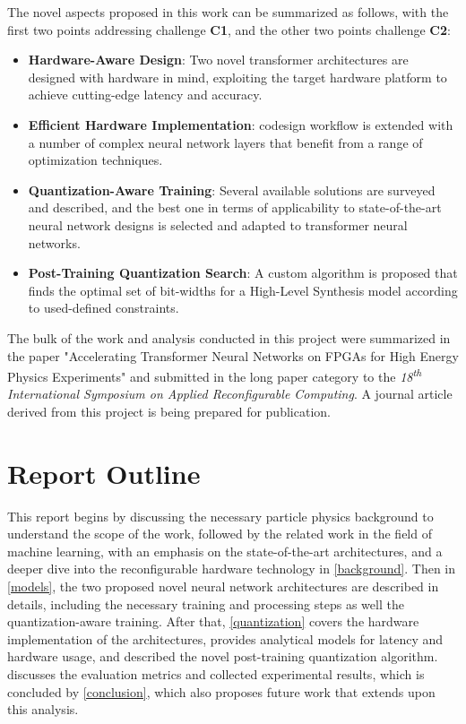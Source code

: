 The novel aspects proposed in this work can be summarized as follows, with the first two points addressing challenge \textbf{C1}, and the other two points challenge \textbf{C2}:

\begin{itemize}
  \item \textbf{Hardware-Aware Design}: Two novel transformer architectures are designed with hardware in mind, exploiting the target hardware platform to achieve cutting-edge latency and accuracy.
  
  \item \textbf{Efficient Hardware Implementation}: \hlsml codesign workflow is extended with a number of complex neural network layers that benefit from a range of optimization techniques.
  
  \item \textbf{Quantization-Aware Training}: Several available solutions are surveyed and described, and the best one in terms of applicability to state-of-the-art neural network designs is selected and adapted to transformer neural networks.
  
  \item \textbf{Post-Training Quantization Search}: A custom algorithm is proposed that finds the optimal set of bit-widths for a High-Level Synthesis model according to used-defined constraints.
\end{itemize}

The bulk of the work and analysis conducted in this project were summarized in the paper "Accelerating Transformer Neural Networks on FPGAs for High Energy Physics Experiments" and submitted in the long paper category to the \textit{18\textsuperscript{th} International Symposium on Applied Reconfigurable Computing}. A journal article derived from this project is being prepared for publication.

\section{Report Outline}
This report begins by discussing the necessary particle physics background to understand the scope of the work, followed by the related work in the field of machine learning, with an emphasis on the state-of-the-art architectures, and a deeper dive into the reconfigurable hardware technology in \cref{background}. Then in \cref{models}, the two proposed novel neural network architectures are described in details, including the necessary training and processing steps as well the quantization-aware training. After that, \cref{quantization} covers the hardware implementation of the architectures, provides analytical models for latency and hardware usage, and described the novel post-training quantization algorithm.  discusses the evaluation metrics and collected experimental results, which is concluded by \cref{conclusion}, which also proposes future work that extends upon this analysis.
